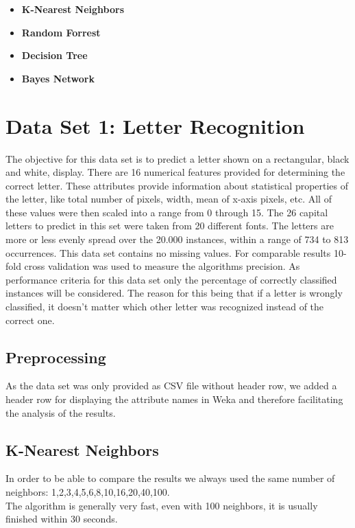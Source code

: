 \documentclass{sig-alternate-05-2015}
\begin{document}
{\begin{itemize}
\item \textbf{K-Nearest Neighbors}
\item \textbf{Random Forrest}
\item \textbf{Decision Tree}
\item \textbf{Bayes Network}
\end{itemize}



\section{Data Set 1: Letter Recognition}
The objective for this data set is to predict a letter shown on a rectangular, black and white, display. There are 16 numerical features  provided for determining the correct letter. These attributes provide information about statistical properties of the letter, like total number of pixels, width, mean of x-axis pixels, etc.
All of these values were then scaled into a range from 0 through 15. The 26 capital letters to predict in this set were taken from 20 different fonts. The letters are more or less evenly spread over the 20.000 instances, within a range of 734 to 813 occurrences. This data set contains no missing values. For comparable results 10-fold cross validation was used to measure the algorithms precision.
As performance criteria for this data set only the percentage of correctly classified instances will be considered. The reason for this being that if a letter is wrongly classified, it doesn't matter which other letter was recognized instead of the correct one. 
\\
\subsection{Preprocessing}
As the data set was only provided as CSV file without header row, we added a header row for displaying the attribute names in Weka and therefore facilitating the analysis of the results. 
\\
\subsection{K-Nearest Neighbors}
In order to be able to compare the results we always used the same number of neighbors: 1,2,3,4,5,6,8,10,16,20,40,100.\\
The algorithm is generally very fast, even with 100 neighbors, it is usually finished within 30 seconds. 
}
\end{document}
